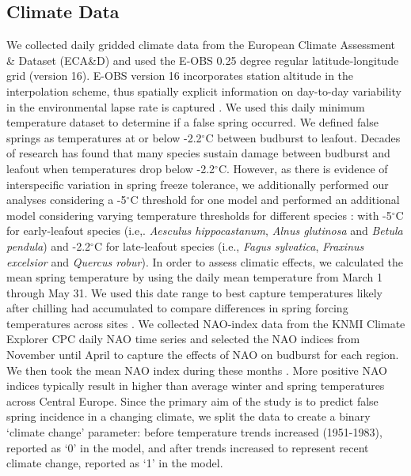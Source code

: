 \documentclass{article}\usepackage[]{graphicx}\usepackage[]{color}
\begin{document}
\subsection*{Climate Data} 
We collected daily gridded climate data from the European Climate Assessment \& Dataset (ECA\&D) and used the E-OBS 0.25 degree regular latitude-longitude grid (version 16). E-OBS version 16 incorporates station altitude in the interpolation scheme, thus spatially explicit information on day-to-day variability in the environmental lapse rate is captured \citep{Cornes2018}. We used this daily minimum temperature dataset to determine if a false spring occurred. We defined false springs as temperatures at or below -2.2$^{\circ}$C \citep{Schwartz1993} between budburst to leafout. Decades of research has found that many species sustain damage between budburst and leafout when temperatures drop below -2.2$^{\circ}$C. However, as there is evidence of interspecific variation in spring freeze tolerance, we additionally performed our analyses considering a -5$^{\circ}$C \citep{Sakai1987,Lenz2013} threshold for one model and performed an additional model considering varying temperature thresholds for different species \citep{Lenz2016,Muffler2016,Zohner2020}: with -5$^{\circ}$C for early-leafout species (i.e,. \textit{Aesculus hippocastanum}, \textit{Alnus glutinosa} and \textit{Betula pendula}) and -2.2$^{\circ}$C for late-leafout species (i.e., \textit{Fagus sylvatica}, \textit{Fraxinus excelsior} and \textit{Quercus robur}). In order to assess climatic effects, we calculated the mean spring temperature by using the daily mean temperature from March 1 through May 31. We used this date range to best capture temperatures likely after chilling had accumulated to compare differences in spring forcing temperatures across sites \citep{Basler2012, Korner2016}. We collected NAO-index data from the KNMI Climate Explorer CPC daily NAO time series and selected the NAO indices from November until April to capture the effects of NAO on budburst for each region. We then took the mean NAO index during these months \citep{NAOdata}. More positive NAO indices typically result in higher than average winter and spring temperatures across Central Europe. Since the primary aim of the study is to predict false spring incidence in a changing climate, we split the data to create a binary `climate change' parameter: before temperature trends increased (1951-1983), reported as `0' in the model, and after trends increased \citep[1984-2016,][]{Stocker2013,Kharouba2018} to represent recent climate change, reported as `1' in the model.
\end{document}
